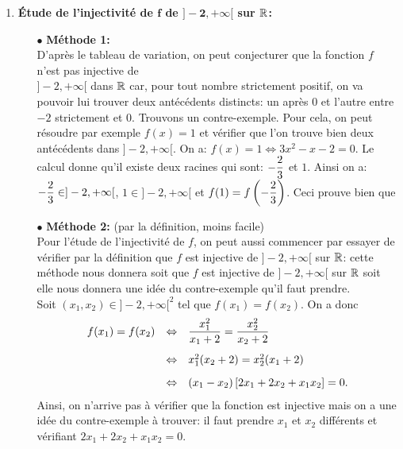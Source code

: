 \documentclass[a4paper, 11pt,reqno]{article}
\begin{document}
\begin{correction}
\begin{enumerate}
\begin{itemize}
		      \end{itemize}
		\item \textbf{\'Etude de l'injectivit\'e de $\mathbf{f}$ de $\mathbf{\rbrack -2,+\infty\lbrack}$ sur $\mathbf{\mathbb{R}}$:}
		      \begin{itemize}
			      \item[$\bullet$] \textbf{M\'ethode 1:} \\
				      \noindent D'apr\`{e}s le tableau de variation, on peut conjecturer que la fonction $f$ n'est pas injective de\\
				      \noindent $\rbrack -2,+\infty\lbrack$ dans $\mathbb{R}$ car, pour tout nombre strictement positif, on va pouvoir lui trouver deux ant\'ec\'edents distincts: un apr\`{e}s 0 et l'autre entre $-2$ strictement et 0. Trouvons un contre-exemple. Pour cela, on peut r\'esoudre par exemple $f(x)=1$ et v\'erifier que l'on trouve bien deux ant\'ec\'edents dans $\rbrack -2,+\infty\lbrack$. On a: $f(x)=1\Leftrightarrow 3x^2-x-2=0$. Le calcul donne qu'il existe deux racines qui sont: $-\displaystyle\frac{2}{3}$ et $1$. Ainsi on a: $-\displaystyle\frac{2}{3}\in\rbrack -2,+\infty\lbrack$, $1\in \rbrack -2,+\infty\lbrack$ et $f(1)=f\left(-\displaystyle\frac{2}{3}  \right)$. Ceci prouve bien que 
			      \item[$\bullet$] \textbf{M\'ethode 2:} (par la d\'efinition, moins facile)\\
				      \noindent Pour l'\'etude de l'injectivit\'e de $f$, on peut aussi commencer par essayer de v\'erifier par la d\'efinition que $f$ est injective de $\rbrack -2,+\infty\lbrack$ sur $\mathbb{R}$: cette m\'ethode nous donnera soit que $f$ est injective de $\rbrack -2,+\infty\lbrack$ sur $\mathbb{R}$ soit elle nous donnera une id\'ee du contre-exemple qu'il faut prendre.\\
				      \noindent Soit $(x_1,x_2)\in\rbrack -2,+\infty\lbrack^2$ tel que $f(x_1)=f(x_2)$. On a donc
				      $$\begin{array}{lll}
						      f(x_1)=f(x_2) & \Leftrightarrow & \ddp\frac{x_1^2}{x_1+2}=\ddp\frac{x_2^2}{x_2+2}\vsec   \\
						                    & \Leftrightarrow & x_1^2(x_2+2)=x_2^2(x_1+2)\vsec                         \\
						                    & \Leftrightarrow & (x_1-x_2)\left\lbrack 2x_1+2x_2+x_1x_2\right\rbrack=0.
					      \end{array}$$
				      Ainsi, on n'arrive pas \`a v\'erifier que la fonction est injective mais on a une id\'ee du contre-exemple \`a trouver: il faut prendre $x_1$ et $x_2$ diff\'erents et v\'erifiant $2x_1+2x_2+x_1x_2=0$.\\

\end{itemize}
\end{enumerate}
\end{correction}
\end{document}
